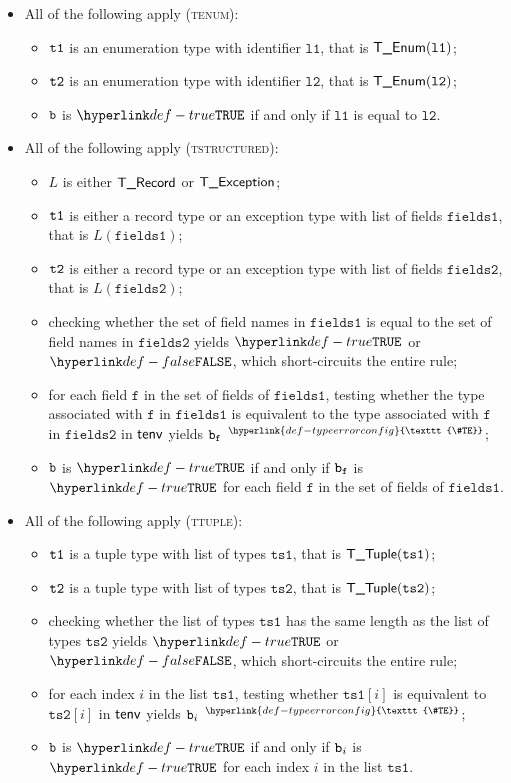 \documentclass{book}
\newcommand\TypeErrorConfig[0]{\hyperlink{def-typeerrorconfig}{\texttt{\#TE}}}
\newcommand\ProseOrTypeError[0]{\hyperlink{def-proseortypeerror}{$^{\TypeErrorConfig}$}}
\newcommand\vf[0]{\texttt{f}}
\newcommand\vtsone[0]{\texttt{ts1}}
\newcommand\vtstwo[0]{\texttt{ts2}}
\newcommand\vfieldsone[0]{\texttt{fields1}}
\newcommand\vfieldstwo[0]{\texttt{fields2}}
\newcommand\vlone[0]{\texttt{l1}}
\newcommand\vltwo[0]{\texttt{l2}}
\begin{document}
\begin{itemize}
  \item All of the following apply (\textsc{tenum}):
  \begin{itemize}
    \item $\texttt{t1}$ is an enumeration type with identifier $\vlone$, that is $\TEnum(\vlone)$;
    \item $\texttt{t2}$ is an enumeration type with identifier $\vltwo$, that is $\TEnum(\vltwo)$;
    \item $\texttt{b}$ is $\True$ if and only if $\vlone$ is equal to $\vltwo$.
  \end{itemize}

  \item All of the following apply (\textsc{tstructured}):
  \begin{itemize}
    \item $L$ is either $\textsf{T\_Record}$ or $\textsf{T\_Exception}$;
    \item $\texttt{t1}$ is either a record type or an exception type with list of fields $\vfieldsone$, that is $L(\vfieldsone)$;
    \item $\texttt{t2}$ is either a record type or an exception type with list of fields $\vfieldstwo$, that is $L(\vfieldstwo)$;
    \item checking whether the set of field names in $\vfieldsone$ is equal to the set of field names in $\vfieldstwo$
          yields $\True$ or $\False$, which short-circuits the entire rule;
    \item for each field $\vf$ in the set of fields of $\vfieldsone$, testing whether the type associated with
          $\vf$ in $\vfieldsone$ is equivalent to the type associated with
          $\vf$ in $\vfieldstwo$ in $\textsf{tenv}$ yields $\vb_\vf$ \ProseOrTypeError;
    \item $\texttt{b}$ is $\True$ if and only if $\vb_\vf$ is $\True$ for each field $\vf$ in the set of fields of $\vfieldsone$.
  \end{itemize}

  \item All of the following apply (\textsc{ttuple}):
  \begin{itemize}
    \item $\texttt{t1}$ is a tuple type with list of types $\vtsone$, that is $\TTuple(\vtsone)$;
    \item $\texttt{t2}$ is a tuple type with list of types $\vtstwo$, that is $\TTuple(\vtstwo)$;
    \item checking whether the list of types $\vtsone$ has the same length as the list of types $\vtstwo$ yields $\True$
          or $\False$, which short-circuits the entire rule;
    \item for each index $i$ in the list $\vtsone$, testing whether $\vtsone[i]$ is equivalent to $\vtstwo[i]$ in $\textsf{tenv}$
          yields $\texttt{b}_i$ \ProseOrTypeError;
    \item $\texttt{b}$ is $\True$ if and only if $\texttt{b}_i$ is $\True$ for each index $i$ in the list $\vtsone$.
  \end{itemize}
\end{itemize}
\end{document}
